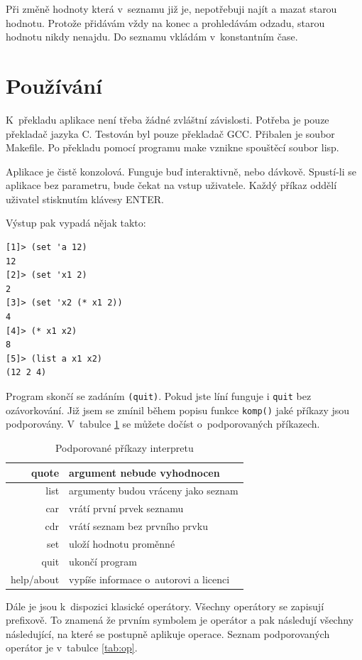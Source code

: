 \documentclass[a4paper, 12pt]{article}
\begin{document}
Při změně hodnoty která v~seznamu již je, nepotřebuji najít a mazat
starou hodnotu. Protože přidávám vždy na konec a prohledávám odzadu,
starou hodnotu nikdy nenajdu. Do seznamu vkládám v~konstantním čase.

\section{Používání}
K~překladu aplikace není třeba žádné zvláštní závislosti. Potřeba je
pouze překladač jazyka C. Testován byl pouze překladač \textsf{GCC}.
Přibalen je soubor \textsf{Makefile}. Po překladu pomocí programu
\textsf{make} vznikne spouštěcí soubor \textsf{lisp}.

Aplikace je čistě konzolová. Funguje buď interaktivně, nebo
dávkově. Spustí-li se aplikace bez parametru, bude čekat na vstup
uživatele. Každý příkaz oddělí uživatel stisknutím klávesy ENTER.

Výstup pak vypadá nějak takto:
\begin{verbatim}
[1]> (set 'a 12)
12
[2]> (set 'x1 2)
2
[3]> (set 'x2 (* x1 2))
4
[4]> (* x1 x2)
8
[5]> (list a x1 x2)
(12 2 4)
\end{verbatim}

Program skončí se zadáním \texttt{(quit)}. Pokud jste líní funguje i
\texttt{quit} bez ozávorkování. Již jsem se zmínil během popisu funkce
\texttt{komp()} jaké příkazy jsou podporovány. V~tabulce \ref{tab:prik}
se můžete dočíst o~podporovaných příkazech.

\begin{table}
\centering
\begin{tabular}{|r|l|}
\hline
quote & argument nebude vyhodnocen\\ \hline
list & argumenty budou vráceny jako seznam\\ \hline
car & vrátí první prvek seznamu\\ \hline
cdr & vrátí seznam bez prvního prvku\\ \hline
set & uloží hodnotu proměnné\\ \hline
quit & ukončí program\\ \hline
help/about & vypíše informace o~autorovi a licenci\\
\hline
\end{tabular}
\caption{Podporované příkazy interpretu}
\label{tab:prik}
\end{table}

Dále je jsou k~dispozici klasické operátory. Všechny operátory se
zapisují prefixově. To znamená že prvním symbolem je operátor a pak
následují všechny následující, na které se postupně aplikuje operace.
Seznam podporovaných operátor je v~tabulce \ref{tab:op}.
\end{document}
